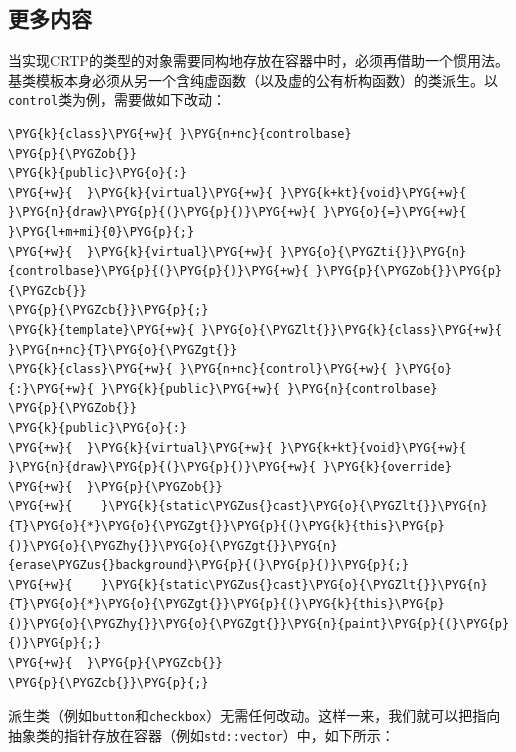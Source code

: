 
\subsection{更多内容}



当实现CRTP的类型的对象需要同构地存放在容器中时，必须再借助一个惯用法。基类模板本身必须从另一个含纯虚函数（以及虚的公有析构函数）的类派生。以\texttt{control}类为例，需要做如下改动：



\begin{codeblockbg}
\begin{Verbatim}[commandchars=\\\{\},breaklines=true,breakanywhere=true,fontsize=\codefont,xleftmargin=17bp]
\PYG{k}{class}\PYG{+w}{ }\PYG{n+nc}{controlbase}
\PYG{p}{\PYGZob{}}
\PYG{k}{public}\PYG{o}{:}
\PYG{+w}{  }\PYG{k}{virtual}\PYG{+w}{ }\PYG{k+kt}{void}\PYG{+w}{ }\PYG{n}{draw}\PYG{p}{(}\PYG{p}{)}\PYG{+w}{ }\PYG{o}{=}\PYG{+w}{ }\PYG{l+m+mi}{0}\PYG{p}{;}
\PYG{+w}{  }\PYG{k}{virtual}\PYG{+w}{ }\PYG{o}{\PYGZti{}}\PYG{n}{controlbase}\PYG{p}{(}\PYG{p}{)}\PYG{+w}{ }\PYG{p}{\PYGZob{}}\PYG{p}{\PYGZcb{}}
\PYG{p}{\PYGZcb{}}\PYG{p}{;}
\PYG{k}{template}\PYG{+w}{ }\PYG{o}{\PYGZlt{}}\PYG{k}{class}\PYG{+w}{ }\PYG{n+nc}{T}\PYG{o}{\PYGZgt{}}
\PYG{k}{class}\PYG{+w}{ }\PYG{n+nc}{control}\PYG{+w}{ }\PYG{o}{:}\PYG{+w}{ }\PYG{k}{public}\PYG{+w}{ }\PYG{n}{controlbase}
\PYG{p}{\PYGZob{}}
\PYG{k}{public}\PYG{o}{:}
\PYG{+w}{  }\PYG{k}{virtual}\PYG{+w}{ }\PYG{k+kt}{void}\PYG{+w}{ }\PYG{n}{draw}\PYG{p}{(}\PYG{p}{)}\PYG{+w}{ }\PYG{k}{override}
\PYG{+w}{  }\PYG{p}{\PYGZob{}}
\PYG{+w}{    }\PYG{k}{static\PYGZus{}cast}\PYG{o}{\PYGZlt{}}\PYG{n}{T}\PYG{o}{*}\PYG{o}{\PYGZgt{}}\PYG{p}{(}\PYG{k}{this}\PYG{p}{)}\PYG{o}{\PYGZhy{}}\PYG{o}{\PYGZgt{}}\PYG{n}{erase\PYGZus{}background}\PYG{p}{(}\PYG{p}{)}\PYG{p}{;}
\PYG{+w}{    }\PYG{k}{static\PYGZus{}cast}\PYG{o}{\PYGZlt{}}\PYG{n}{T}\PYG{o}{*}\PYG{o}{\PYGZgt{}}\PYG{p}{(}\PYG{k}{this}\PYG{p}{)}\PYG{o}{\PYGZhy{}}\PYG{o}{\PYGZgt{}}\PYG{n}{paint}\PYG{p}{(}\PYG{p}{)}\PYG{p}{;}
\PYG{+w}{  }\PYG{p}{\PYGZcb{}}
\PYG{p}{\PYGZcb{}}\PYG{p}{;}
\end{Verbatim}
\end{codeblockbg}



派生类（例如\texttt{button}和\texttt{checkbox}）无需任何改动。这样一来，我们就可以把指向抽象类的指针存放在容器（例如\texttt{std::\allowbreak{}vector}）中，如下所示：


